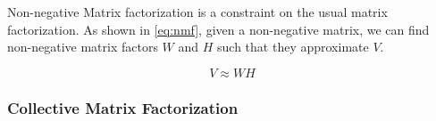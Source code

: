 Non-negative Matrix factorization is a constraint on the usual matrix factorization. As shown in \ref{eq:nmf}, given a non-negative matrix, we can find non-negative matrix factors $W$ and $H$ such that they approximate $V$.

\begin{equation} \label{eq:nmf}
	V \approx W H
\end{equation}




\subsubsection{Collective Matrix Factorization}
